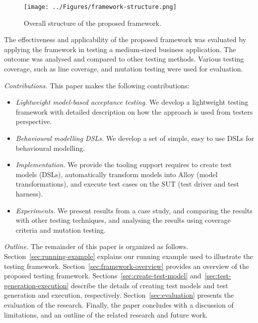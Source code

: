 \begin{figure}[!t]
\centering
\texttt{[image: ../Figures/framework-structure.png]}
\caption{Overall structure of the proposed framework.}
\label{fig:framework-structure}
\end{figure}

The effectiveness and applicability of the proposed framework was evaluated by applying the framework in testing a medium-sized business application. The outcome was analysed and compared to other testing methods. Various testing coverage, such as line coverage, and mutation testing were used for  evaluation.

\textit{Contributions.} This paper makes the following
contributions:
\begin{itemize}
	\item \textit{Lightweight model-based acceptance testing.} We develop a lightweight testing framework with detailed description on how the approach is used from testers perspective.
	
	\item \textit{Behavioural modelling DSLs.} We develop a set of simple, easy to use DSLs for behavioural modelling.
	
	\item \textit{Implementation.} We provide the tooling support requires to create test models (DSLs), automatically transform models into Alloy (model transformations), and execute test cases on the SUT (test driver and test harness).
	
	\item \textit{Experiments. } We present results from a case study, and comparing the results with other testing techniques, and analysing the results using coverage criteria and mutation testing.
\end{itemize}

\textit{Outline.} The remainder of this paper is organized as
follows. 
Section~\ref{sec:running-example} explains our running example used to illustrate the testing framework. Section~\ref{sec:framework-overview} provides an overview of the proposed testing framework. Sections~\ref{sec:create-test-model} and~\ref{sec:test-generation-execution} describe the details of creating test models and test generation and execution, respectively. Section~\ref{sec:evaluation} presents the evaluation of the research. Finally, the paper concludes with a discussion of limitations, and an outline of the related research and future work.
